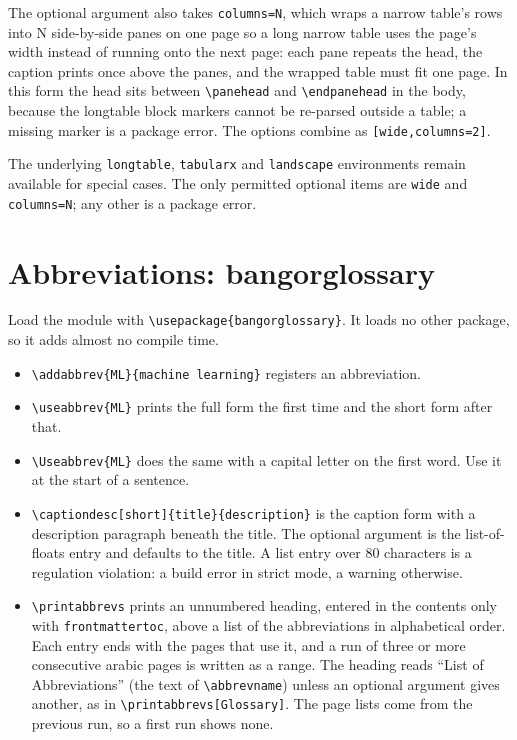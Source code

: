 \documentclass[a4paper,12pt]{article}
\begin{document}
The optional argument also takes \verb|columns=N|, which wraps a
narrow table's rows into N side-by-side panes on one page so a long
narrow table uses the page's width instead of running onto the next
page: each pane repeats the head, the caption prints once above the
panes, and the wrapped table must fit one page. In this form the head
sits between \verb|\panehead| and \verb|\endpanehead| in the body,
because the longtable block markers cannot be re-parsed outside a
table; a missing marker is a package error. The options combine as
\verb|[wide,columns=2]|.

The underlying \verb|longtable|, \verb|tabularx| and \verb|landscape|
environments remain available for special cases. The only permitted
optional items are \verb|wide| and \verb|columns=N|; any other is a
package error.

\section{Abbreviations: bangorglossary}
Load the module with \verb|\usepackage{bangorglossary}|. It loads no other
package, so it adds almost no compile time.

\begin{itemize}
  \item \verb|\addabbrev{ML}{machine learning}| registers an abbreviation.
  \item \verb|\useabbrev{ML}| prints the full form the first time and the
        short form after that.
  \item \verb|\Useabbrev{ML}| does the same with a capital letter on the
        first word. Use it at the start of a sentence.
  \item \verb|\captiondesc[short]{title}{description}| is the caption form
        with a description paragraph beneath the title. The optional argument
        is the list-of-floats entry and defaults to the title. A list entry
        over 80 characters is a regulation violation: a build error in strict
        mode, a warning otherwise.
  \item \verb|\printabbrevs| prints an unnumbered heading, entered in the
        contents only with \verb|frontmattertoc|, above a list of the
        abbreviations in alphabetical order. Each
        entry ends with the pages that use it, and a run of three or more
        consecutive arabic pages is written as a range. The heading reads
        ``List of Abbreviations'' (the text of \verb|\abbrevname|) unless an optional argument gives another, as in
        \verb|\printabbrevs[Glossary]|. The page lists come from
        the previous run, so a first run shows none.
\end{itemize}
\end{document}
